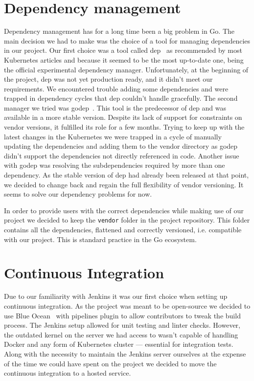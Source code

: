 \section{Dependency management}
Dependency management has for a long time been a big problem in Go. The main decision we had to make
was the choice of a tool for managing dependencies in our project. Our first choice was a tool called
dep~\cite{dep} as recommended by most Kubernetes articles and because it seemed to be the most up-to-date one,
being the official experimental dependency manager. Unfortunately, at the beginning of the project,
dep was not yet production ready, and it didn’t meet our requirements. We encountered trouble adding
some dependencies and were trapped in dependency cycles that dep couldn’t handle gracefully. The
second manager we tried was godep~\cite{godep}. This tool is the predecessor of dep and was available in a more
stable version. Despite its lack of support for constraints on vendor versions, it fulfilled its
role for a few months. Trying to keep up with the latest changes in the Kubernetes we were trapped
in a cycle of manually updating the dependencies and adding them to the vendor directory as godep didn’t
support the dependencies not directly referenced in code. Another issue with godep was resolving the
subdependencies required by more than one dependency. As the stable version of dep had already been
released at that point, we decided to change back and regain the full flexibility of vendor
versioning. It seems to solve our dependency problems for now.

In order to provide users with the correct dependencies while making use of our project we decided
to keep the \texttt{vendor} folder in the project repository. This folder contains all the
dependencies, flattened and correctly versioned, i.e. compatible with our project. This is standard
practice in the Go ecosystem.

\section{Continuous Integration}
Due to our familiarity with Jenkins it was our first choice when setting up continuous integration.
As the project was meant to be open-source we decided to use Blue Ocean~\cite{blueocean} with pipelines plugin to
allow contributors to tweak the build process. The Jenkins setup allowed for unit testing and
linter checks. However, the outdated kernel on the server we had access to wasn’t capable of handling
Docker and any form of Kubernetes cluster --- essential for integration tests. Along with the
necessity to maintain the Jenkins server ourselves at the expense of the time we could have spent
on the project we decided to move the continuous integration to a hosted service.

